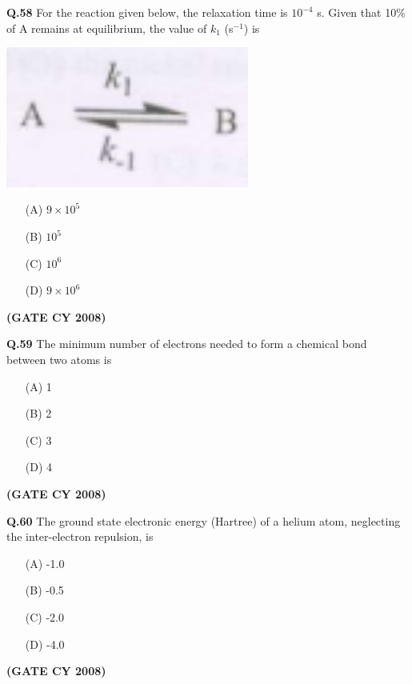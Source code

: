 \documentclass[12pt]{article}
\begin{document}
\begin{enumerate}
\textbf{Q.58} For the reaction given below, the relaxation time is $10^{-4}$ s. Given that 10\% of A remains at equilibrium, the value of $k_1$ (s$^{-1}$) is

\begin{center}
\includegraphics[width=0.6\textwidth]{figs/q58.png}
\end{center}

\begin{enumerate}
\item[(A)] $9 \times 10^5$
\item[(B)] $10^5$
\item[(C)] $10^6$
\item[(D)] $9 \times 10^6$
\end{enumerate}   \textbf{(GATE CY 2008)}


\vspace{0.5cm}

\textbf{Q.59} The minimum number of electrons needed to form a chemical bond between two atoms is

\begin{enumerate}
\item[(A)] 1
\item[(B)] 2
\item[(C)] 3
\item[(D)] 4
\end{enumerate}   \textbf{(GATE CY 2008)}


\vspace{0.5cm}

\textbf{Q.60} The ground state electronic energy (Hartree) of a helium atom, neglecting the inter-electron repulsion, is

\begin{enumerate}
\item[(A)] -1.0
\item[(B)] -0.5
\item[(C)] -2.0
\item[(D)] -4.0
\end{enumerate}   \textbf{(GATE CY 2008)}


\vspace{0.5cm}


\end{enumerate}
\end{document}

